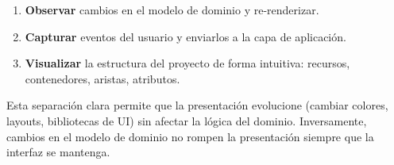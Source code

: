 \documentclass{article}
\begin{document}
{        \begin{enumerate}
        \item \textbf{Observar} cambios en el modelo de dominio y re-renderizar.
        \item \textbf{Capturar} eventos del usuario y enviarlos a la capa de
        aplicación.
        \item \textbf{Visualizar} la estructura del proyecto de forma intuitiva:
        recursos, contenedores, aristas, atributos.
        \end{enumerate}

        \justify
        Esta separación clara permite que la presentación evolucione (cambiar colores,
        layouts, bibliotecas de UI) sin afectar la lógica del dominio. Inversamente,
        cambios en el modelo de dominio no rompen la presentación siempre que la
        interfaz se mantenga.
        \par

    }

    


    \newpage
\end{document}
